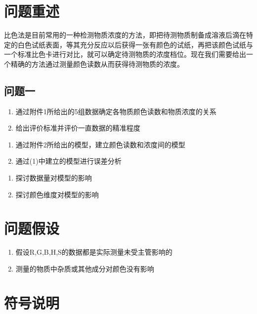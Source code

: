 \section{问题重述}
比色法是目前常用的一种检测物质浓度的方法，即把待测物质制备成溶液后滴在特定的白色试纸表面，等其充分反应以后获得一张有颜色的试纸，再把该颜色试纸与一个标准比色卡进行对比，就可以确定待测物质的浓度档位。现在我们需要给出一个精确的方法通过测量颜色读数从而获得待测物质的浓度。
\subsection{问题一}
\begin{enumerate}[(1)]
\item 通过附件1所给出的5组数据确定各物质颜色读数和物质浓度的关系
\item 给出评价标准并评价一直数据的精准程度
\end{enumerate}

\begin{enumerate}[(1)]
\item 通过附件2所给出的模型，建立颜色读数和浓度间的模型
\item 通过(1)中建立的模型进行误差分析
\end{enumerate}

\begin{enumerate}[(1)]
\item 探讨数据量对模型的影响
\item 探讨颜色维度对模型的影响
\end{enumerate}

\section{问题假设}
\begin{enumerate}[(1)]
\item 假设R,G,B,H,S的数据都是实际测量未受主管影响的
\item 测量的物质中杂质或其他成分对颜色没有影响
\end{enumerate}

\section{符号说明}
